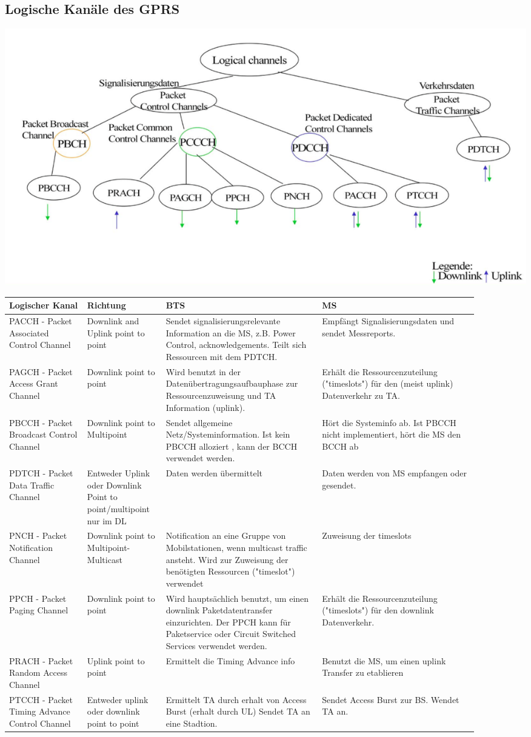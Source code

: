 \subsection{Logische Kanäle des GPRS}
\includegraphics[width = 0.6 \linewidth]{./Pics/GPRSKanaele}

\begin{tabular}{p{0.15 \linewidth} p{0.15 \linewidth} p{0.3 \linewidth} p{0.3 \linewidth}}
\toprule
Logischer Kanal & Richtung & BTS & MS \\
\midrule
PACCH - Packet Associated Control Channel & Downlink and Uplink point to point & Sendet signalisierungsrelevante Information an die MS, z.B. Power Control, acknowledgements. Teilt sich Ressourcen mit dem PDTCH. & Empfängt Signalisierungsdaten und sendet Messreports.\\
\midrule
PAGCH - Packet Access Grant Channel & Downlink point to point & Wird benutzt in der Datenübertragungsaufbauphase zur Ressourcenzuweisung und TA Information (uplink). & Erhält die Ressourcenzuteilung ("timeslots") für den (meist uplink) Datenverkehr zu TA. \\
\midrule
PBCCH - Packet Broadcast Control Channel & Downlink point to Multipoint & Sendet allgemeine Netz/Systeminformation. Ist kein PBCCH alloziert , kann der BCCH verwendet werden. & Hört die Systeminfo ab. Ist PBCCH nicht implementiert, hört die MS den BCCH ab \\
\midrule
PDTCH - Packet Data Traffic Channel & Entweder Uplink oder Downlink Point to point/multipoint nur im DL & Daten werden übermittelt & Daten werden von MS empfangen oder gesendet. \\
\midrule
PNCH - Packet Notification Channel & Downlink point to Multipoint-Multicast & Notification an eine Gruppe von Mobilstationen, wenn multicast traffic ansteht. Wird zur Zuweisung der benötigten Ressourcen ("timeslot") verwendet & Zuweisung der timeslots\\
\midrule
PPCH - Packet Paging Channel & Downlink point to point & Wird hauptsächlich benutzt, um einen downlink Paketdatentransfer einzurichten. Der PPCH kann für Paketservice oder Circuit Switched Services verwendet werden. & Erhält die Ressourcenzuteilung ("timeslots") für den downlink Datenverkehr. \\
\midrule
PRACH - Packet Random Access Channel & Uplink point to point & Ermittelt die Timing Advance info & Benutzt die MS, um einen uplink Transfer zu etablieren \\
\midrule
PTCCH - Packet Timing Advance Control Channel & Entweder uplink oder downlink point to point & Ermittelt TA durch erhalt von Access Burst (erhalt durch UL) Sendet TA an eine Stadtion. & Sendet Access Burst zur BS. Wendet TA an. \\
\bottomrule
\end{tabular}
